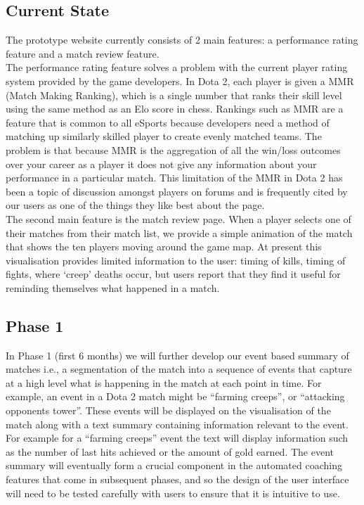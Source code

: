 \documentclass[12pt]{article} %
\begin{document}
\subsection{Current State}

The prototype website currently consists of 2 main features: a performance rating feature and a match review feature.\\ 

The performance rating feature solves a problem with the current player rating system provided by the game developers. In Dota 2, each player is given a MMR (Match Making Ranking), which is a single number that ranks their skill level using the same method as an Elo score in chess. Rankings such as MMR are a feature that is common to all eSports because developers need a method of matching up similarly skilled player to create evenly matched teams. The problem is that because MMR is the aggregation of all the win/loss outcomes over your career as a player it does not give any information about your performance in a particular match. This limitation of the MMR in Dota 2 has been a topic of discussion amongst players on forums and is frequently cited by our users as one of the things they like best about the page.\\

The second main feature is the match review page. When a player selects one of their matches from their match list, we provide a simple animation of the match that shows the ten players moving around the game map. At present this visualisation provides limited information to the user: timing of kills, timing of fights, where `creep' deaths occur, but users report that they find it useful for reminding themselves what happened in a match.

\subsection{Phase 1} 

In Phase 1 (first 6 months) we will further develop our event based summary of matches i.e., a segmentation of the match into a sequence of events that capture at a high level what is happening in the match at each point in time. For example, an event in a Dota 2 match might be ``farming creeps'', or ``attacking opponents tower''. These events will be displayed on the visualisation of the match along with a text summary containing information relevant to the event. For example for a ``farming creeps'' event the text will display information such as the number of last hits achieved or the amount of gold earned. The event summary will eventually form a crucial component in the automated coaching features that come in subsequent phases, and so the design of the user interface will need to be tested carefully with users to ensure that it is intuitive to use.\\
\end{document}
